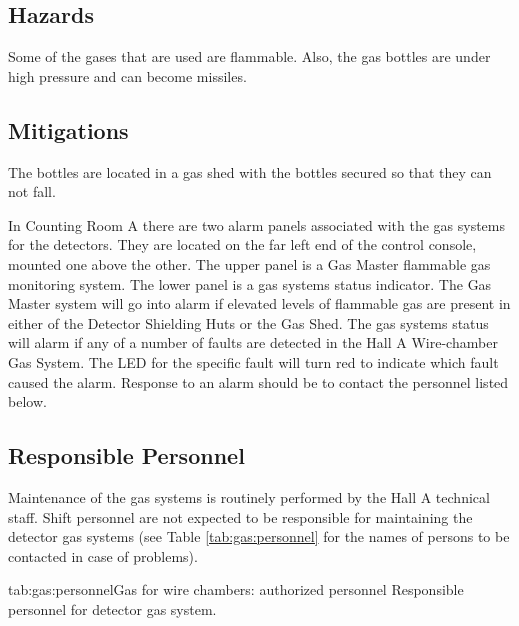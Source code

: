 \begin{safetyen}{0}{0}
\label{sec:hrs-det-gasalarms}

\subsection{Hazards}

Some of the gases that are used are flammable.  Also, the gas bottles
are under high pressure and can become missiles.

\subsection{Mitigations}

The bottles are located in a gas shed with the bottles secured so that
they can not fall.

In Counting Room A there are two alarm panels associated with the gas
systems for the detectors.  They are located on the far left end of the
control console, mounted one above the other.  The upper panel is a
Gas Master flammable gas monitoring system.  The lower panel is a gas
systems status indicator.  The Gas Master system will go into alarm if
elevated levels of flammable gas are present in either of the Detector
Shielding Huts or the Gas Shed.
The gas systems status will
alarm if any of a number of faults are detected in the Hall A Wire-chamber
Gas System.  The LED for the specific fault will turn red to indicate which
fault caused the alarm.
Response to an alarm should be to contact the personnel listed below.

\subsection{Responsible Personnel}

Maintenance of the gas systems is routinely performed by the Hall A
technical staff.  Shift personnel are not expected to be responsible
for maintaining the detector gas systems (see Table \ref{tab:gas:personnel}  
for the names of persons to be contacted in case of problems). 

\begin{namestab}{tab:gas:personnel}{Gas for wire chambers: authorized personnel}{%
      Responsible personnel for detector gas system.}
  \ChandanGhosh{}
\end{namestab}
\end{safetyen}
